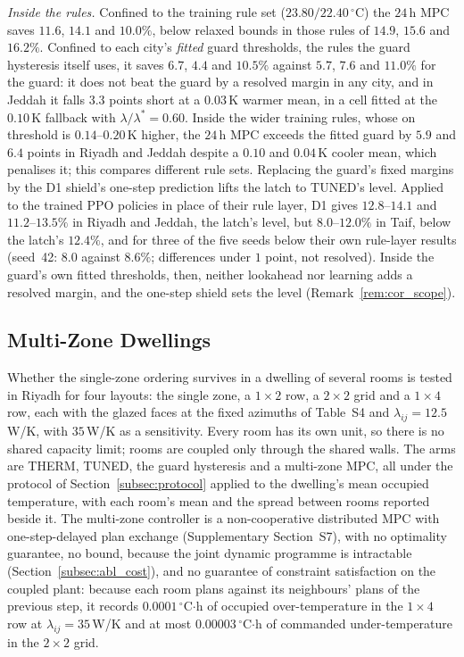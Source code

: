 \documentclass[pdflatex,sn-mathphys-num,iicol]{sn-jnl}
\theoremstyle{thmstyleone}\newtheorem{proposition}{Proposition}\newtheorem{corollary}{Corollary}
\theoremstyle{thmstyletwo}\newtheorem{remark}{Remark}\newtheorem{observation}{Observation}
\theoremstyle{thmstylethree}\newtheorem{definition}{Definition}
\newcommand{\lij}{\lambda_{ij}}
\begin{document}
\emph{Inside the rules.} Confined to the training rule set ($23.80/22.40\,^\circ$C) the $24\,$h MPC saves $11.6$, $14.1$ and $10.0\%$, below relaxed bounds in those rules of $14.9$, $15.6$ and $16.2\%$. Confined to each city's \emph{fitted} guard thresholds, the rules the guard hysteresis itself uses, it saves $6.7$, $4.4$ and $10.5\%$ against $5.7$, $7.6$ and $11.0\%$ for the guard: it does not beat the guard by a resolved margin in any city, and in Jeddah it falls $3.3$ points short at a $0.03\,$K warmer mean, in a cell fitted at the $0.10\,$K fallback with $\lambda/\lambda^\ast=0.60$. Inside the wider training rules, whose on threshold is $0.14$--$0.20\,$K higher, the $24\,$h MPC exceeds the fitted guard by $5.9$ and $6.4$ points in Riyadh and Jeddah despite a $0.10$ and $0.04\,$K cooler mean, which penalises it; this compares different rule sets. Replacing the guard's fixed margins by the D1 shield's one-step prediction lifts the latch to TUNED's level. Applied to the trained PPO policies in place of their rule layer, D1 gives $12.8$--$14.1$ and $11.2$--$13.5\%$ in Riyadh and Jeddah, the latch's level, but $8.0$--$12.0\%$ in Taif, below the latch's $12.4\%$, and for three of the five seeds below their own rule-layer results (seed~42: $8.0$ against $8.6\%$; differences under $1$ point, not resolved). Inside the guard's own fitted thresholds, then, neither lookahead nor learning adds a resolved margin, and the one-step shield sets the level (Remark~\ref{rem:cor_scope}).

\subsection{Multi-Zone Dwellings}
\label{subsec:multizone}
\label{subsec:res_all}

Whether the single-zone ordering survives in a dwelling of several rooms is tested in Riyadh for four layouts: the single zone, a $1\times2$ row, a $2\times2$ grid and a $1\times4$ row, each with the glazed faces at the fixed azimuths of Table~S4 and $\lij=12.5\,$W/K, with $35\,$W/K as a sensitivity. Every room has its own unit, so there is no shared capacity limit; rooms are coupled only through the shared walls. The arms are THERM, TUNED, the guard hysteresis and a multi-zone MPC, all under the protocol of Section~\ref{subsec:protocol} applied to the dwelling's mean occupied temperature, with each room's mean and the spread between rooms reported beside it. The multi-zone controller is a non-cooperative distributed MPC with one-step-delayed plan exchange \citep{Scattolini2009} (Supplementary Section~S7), with no optimality guarantee, no bound, because the joint dynamic programme is intractable (Section~\ref{subsec:abl_cost}), and no guarantee of constraint satisfaction on the coupled plant: because each room plans against its neighbours' plans of the previous step, it records $0.0001\,^\circ$C$\cdot$h of occupied over-temperature in the $1\times4$ row at $\lij=35\,$W/K and at most $0.00003\,^\circ$C$\cdot$h of commanded under-temperature in the $2\times2$ grid.
\end{document}
